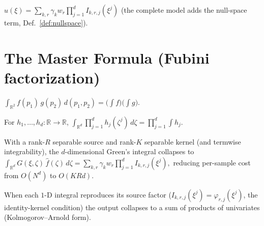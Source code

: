 \begin{definition}\label{def:igl-output}
  \leanok
  $\displaystyle u(\xi)=\sum_{k,r}\gamma_k w_r\prod_{j=1}^{d} I_{k,r,j}(\xi^j)$
  (the complete model adds the null-space term, Def.~\ref{def:nullspace}).
\end{definition}

\section{The Master Formula (Fubini factorization)}

\begin{theorem}\label{thm:fubini-rank1}
  \leanok
  $\displaystyle \int_{\mathbb R^2} f(p_1)\,g(p_2)\,d(p_1,p_2)=\Big(\int f\Big)\Big(\int g\Big).$
\end{theorem}

\begin{theorem}\label{thm:fubini-dfold}
  \leanok
  For $h_1,\dots,h_d:\mathbb R\to\mathbb R$,
  $\displaystyle \int_{\mathbb R^d}\prod_{j=1}^{d} h_j(\zeta^j)\,d\zeta=\prod_{j=1}^{d}\int h_j.$
\end{theorem}

\begin{theorem}\label{thm:master-formula}
  \leanok
  With a rank-$R$ separable source and rank-$K$ separable kernel (and termwise
  integrability), the $d$-dimensional Green's integral collapses to
  $\displaystyle \int_{\mathbb R^d} G(\xi,\zeta)\,\hat f(\zeta)\,d\zeta
     =\sum_{k,r}\gamma_k w_r\prod_{j=1}^{d} I_{k,r,j}(\xi^j),$
  reducing per-sample cost from $O(N^d)$ to $O(KRd)$.
\end{theorem}

\begin{corollary}[KANs as $G=\mathrm{Id}$]\label{cor:kan}
  \leanok{}
  When each $1$-D integral reproduces its source factor ($I_{k,r,j}(\xi^j)=\varphi_{r,j}(\xi^j)$,
  the identity-kernel condition) the output collapses to a sum of products of univariates
  (Kolmogorov–Arnold form).
\end{corollary}

